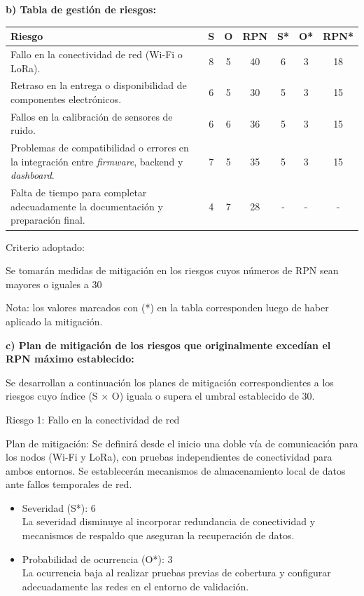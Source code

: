 \documentclass[
11pt, %
]{charter}
\begin{document}
\textbf{b) Tabla de gestión de riesgos:}     

\begin{table}[htpb]
\centering
\begin{tabularx}{\linewidth}{@{}|X|c|c|c|c|c|c|@{}}
\hline
\rowcolor[HTML]{C0C0C0} 
Riesgo & S & O & RPN & S* & O* & RPN* \\ \hline
Fallo en la conectividad de red (Wi-Fi o LoRa).      &  8 &  5 &  40   &  6  &  3  &   18   \\ \hline
Retraso en la entrega o disponibilidad de componentes electrónicos.       & 6  &  5 &  30   &  5  &  3  &  15    \\ \hline
Fallos en la calibración de sensores de ruido.       &  6 &  6 &   36  &  5  &  3  &   15   \\ \hline
Problemas de compatibilidad o errores en la integración entre \textit{firmware}, backend y \textit{dashboard}.       & 7  & 5  &  35   &  5  & 3   & 15     \\ \hline
Falta de tiempo para completar adecuadamente la documentación y preparación final.       & 4  &  7 &  28   &  -  & -   &   -   \\ \hline
\end{tabularx}%
\end{table}

Criterio adoptado: 

Se tomarán medidas de mitigación en los riesgos cuyos números de RPN sean mayores o iguales a 30

Nota: los valores marcados con (*) en la tabla corresponden luego de haber aplicado la mitigación.

\textbf{c) Plan de mitigación de los riesgos que originalmente excedían el RPN máximo establecido:}
 
Se desarrollan a continuación los planes de mitigación correspondientes a los riesgos cuyo índice (S × O) iguala o supera el umbral establecido de 30.

Riesgo 1: Fallo en la conectividad de red

Plan de mitigación: Se definirá desde el inicio una doble vía de comunicación para los nodos (Wi-Fi y LoRa), con pruebas independientes de conectividad para ambos entornos. Se establecerán mecanismos de almacenamiento local de datos ante fallos temporales de red.

\begin{itemize}
	\item Severidad (S*): 6\\
	La severidad disminuye al incorporar redundancia de conectividad y mecanismos de respaldo que aseguran la recuperación de datos.
	\item Probabilidad de ocurrencia (O*): 3\\
	La ocurrencia baja al realizar pruebas previas de cobertura y configurar adecuadamente las redes en el entorno de validación.
\end{itemize}
\end{document}
